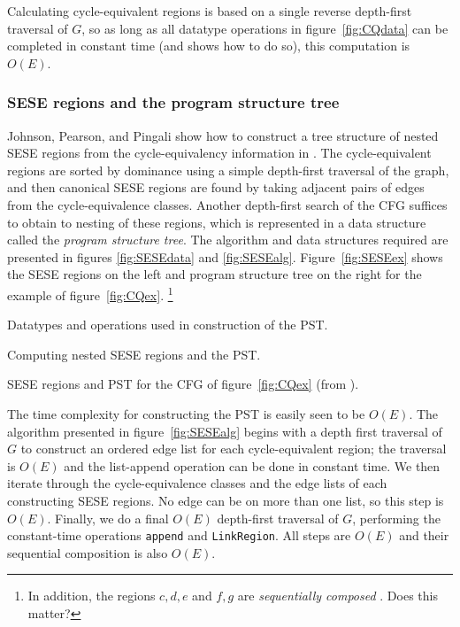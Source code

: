\documentclass[12pt,titlepage]{article}
\begin{document}
Calculating cycle-equivalent regions is based on a single reverse
depth-first traversal of $G$, so as long as all datatype operations in
figure~\ref{fig:CQdata} can be completed in constant time (and
\cite{johnson93:sese} shows how to do so), this computation is $O(E)$.

\subsubsection{SESE regions and the program structure tree}
Johnson, Pearson, and Pingali show how to construct a tree structure
of nested SESE regions from the cycle-equivalency information in
\cite{johnson94:pst}.  The cycle-equivalent regions are sorted by
dominance using a simple depth-first traversal of the graph, and then
canonical SESE regions are found by taking adjacent pairs of
edges from the cycle-equivalence classes.  Another depth-first search
of the CFG suffices to obtain to nesting of these regions,
which is represented in a data structure called the 
\emph{program structure tree}.
The algorithm and data structures required are presented in figures
\ref{fig:SESEdata} and \ref{fig:SESEalg}.  Figure~\vref{fig:SESEex}
shows the SESE regions on the left and program structure tree on
the right for the example of figure~\vref{fig:CQex}.%
\footnote{In addition, the regions ${c,d,e}$ and ${f,g}$ are
\emph{sequentially composed} \cite{johnson94:pst}.  Does this matter?}

\begin{myfigure}\small
\caption{Datatypes and operations used in construction of the PST.}
\label{fig:SESEdata}\end{myfigure}

\begin{myfigure}\small\linespread{0.75}
\caption{Computing nested SESE regions and the PST.}
\label{fig:SESEalg}\end{myfigure}

\begin{myfigure}\centering
\vertcenter{}\hspace{1cm}
\vertcenter{}
\caption{SESE regions and PST for the CFG of
         figure~\ref{fig:CQex} (from \cite{johnson94:pst}).}
\label{fig:SESEex}\end{myfigure}

The time complexity for constructing the PST is easily seen to be
$O(E)$. The algorithm presented in figure~\vref{fig:SESEalg} begins
with a depth first traversal of $G$ to construct an ordered edge list
for each cycle-equivalent region; the traversal is $O(E)$ and the
list-append operation can be done in constant time.  We then iterate
through the cycle-equivalence classes and the edge lists of each
constructing SESE regions.  No edge can be on more than one list, so
this step is $O(E)$.  Finally, we do a final $O(E)$ depth-first
traversal of $G$, performing the constant-time operations {\tt append}
and {\tt LinkRegion}.  All steps are $O(E)$ and their sequential
composition is also $O(E)$.
\end{document}
